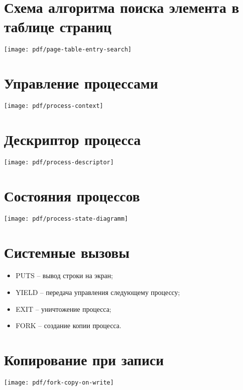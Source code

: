 \documentclass[12pt]{article}
\begin{document}
\section{\textbf{Схема алгоритма поиска элемента в таблице страниц}}
\begin{center}
\texttt{[image: pdf/page-table-entry-search]}
\end{center}


\section{\textbf{Управление процессами}}
\begin{center}
\texttt{[image: pdf/process-context]}
\end{center}


\section{\textbf{Дескриптор процесса}}
\begin{center}
\texttt{[image: pdf/process-descriptor]}
\end{center}


\section{\textbf{Состояния процессов}}
\begin{center}
\texttt{[image: pdf/process-state-diagramm]}
\end{center}


\section{\textbf{Системные вызовы}}
\begin{itemize}
\item PUTS -- вывод строки на экран;
\item YIELD -- передача управления следующему процессу;
\item EXIT -- уничтожение процесса;
\item FORK -- создание копии процесса.
\end{itemize}


\section{\textbf{Копирование при записи}}
\texttt{[image: pdf/fork-copy-on-write]}
\end{document}
